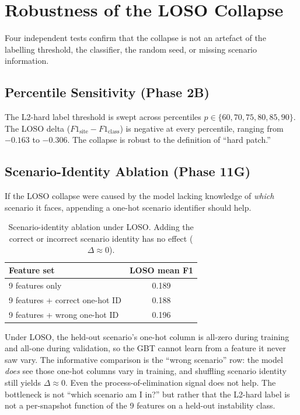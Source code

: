 \documentclass[12pt, a4paper, oneside]{report}
\begin{document}
\section{Robustness of the LOSO Collapse}
\label{sec:robustness}

Four independent tests confirm that the collapse is not an artefact of the labelling threshold, the classifier, the random seed, or missing scenario information.

\subsection{Percentile Sensitivity (Phase 2B)}

The L2-hard label threshold is swept across percentiles $p \in \{60, 70, 75, 80, 85, 90\}$. The LOSO delta ($F1_\text{site} - F1_\text{class}$) is negative at every percentile, ranging from $-0.163$ to $-0.306$. The collapse is robust to the definition of ``hard patch.''

\subsection{Scenario-Identity Ablation (Phase 11G)}

If the LOSO collapse were caused by the model lacking knowledge of \textit{which} scenario it faces, appending a one-hot scenario identifier should help.

\begin{table}[H]
\centering
\caption{Scenario-identity ablation under LOSO. Adding the correct or incorrect scenario identity has no effect ($\Delta \approx 0$).}
\label{tab:scenario-ablation}
\begin{tabular}{lc}
\toprule
\textbf{Feature set} & \textbf{LOSO mean F1} \\
\midrule
9 features only & 0.189 \\
9 features + correct one-hot ID & 0.188 \\
9 features + wrong one-hot ID & 0.196 \\
\bottomrule
\end{tabular}
\end{table}

Under LOSO, the held-out scenario's one-hot column is all-zero during training and all-one during validation, so the GBT cannot learn from a feature it never saw vary. The informative comparison is the ``wrong scenario'' row: the model \textit{does} see those one-hot columns vary in training, and shuffling scenario identity still yields $\Delta \approx 0$. Even the process-of-elimination signal does not help. The bottleneck is not ``which scenario am I in?'' but rather that the L2-hard label is not a per-snapshot function of the 9 features on a held-out instability class.
\end{document}
